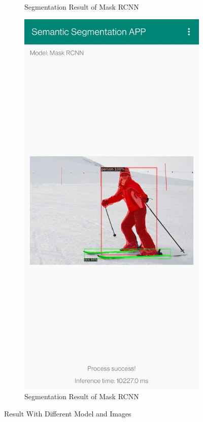 \begin{figure}[htbp]
\begin{subfigure}[t]{0.3\linewidth}
        \caption{Segmentation Result of Mask RCNN}\label{resultmaskrcnn}
    \end{subfigure}
    \begin{subfigure}[t]{0.3\linewidth}
        \includegraphics[width=1\textwidth]{figures/ski.jpg}
        \caption{Segmentation Result of Mask RCNN}\label{resultskimaskrcnn}
    \end{subfigure}
    \caption{Result With Different Model and Images}\label{result2}
\end{figure}

